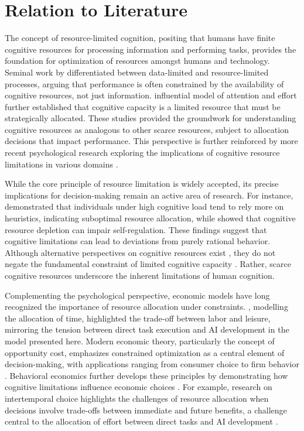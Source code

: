 \section{Relation to Literature}
\label{sec:lit}
The concept of resource-limited cognition, positing that humans have finite cognitive resources for processing information and performing tasks, provides the foundation for optimization of resources amongst humans and technology. Seminal work by \cite{norman1975data} differentiated between data-limited and resource-limited processes, arguing that performance is often constrained by the availability of cognitive resources, not just information. \cite{kahneman1973attention} influential model of attention and effort further established that cognitive capacity is a limited resource that must be strategically allocated. These studies provided the groundwork for understanding cognitive resources as analogous to other scarce resources, subject to allocation decisions that impact performance. This perspective is further reinforced by more recent psychological research exploring the implications of cognitive resource limitations in various domains \citep{engle2018working}.

While the core principle of resource limitation is widely accepted, its precise implications for decision-making remain an active area of research. For instance, \cite{deck2015effect} demonstrated that individuals under high cognitive load tend to rely more on heuristics, indicating suboptimal resource allocation, while \cite{hagger2010ego} showed that cognitive resource depletion can impair self-regulation. These findings suggest that cognitive limitations can lead to deviations from purely rational behavior. Although alternative perspectives on cognitive resources exist \citep{tuk2015propagation,inzlicht2021integrating}, they do not negate the fundamental constraint of limited cognitive capacity \citep{palma2018self}. Rather, scarce cognitive resources underscore the inherent limitations of human cognition.

Complementing the psychological perspective, economic models have long recognized the importance of resource allocation under constraints. \cite{becker1965theory}, modelling the allocation of time, highlighted the trade-off between labor and leisure, mirroring the tension between direct task execution and AI development in the model presented here. Modern economic theory, particularly the concept of opportunity cost, emphasizes constrained optimization as a central element of decision-making, with applications ranging from consumer choice to firm behavior \citep{varian1992microeconomic}. Behavioral economics further develops these principles by demonstrating how cognitive limitations influence economic choices \citep{thaler2016behavioral}. For example, research on intertemporal choice highlights the challenges of resource allocation when decisions involve trade-offs between immediate and future benefits, a challenge central to the allocation of effort between direct tasks and AI development \citep{loewenstein1992anomalies,kim2019effect}.

